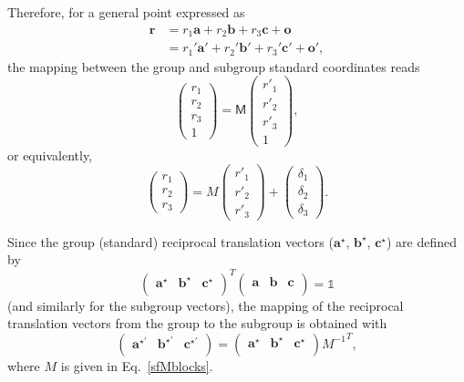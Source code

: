 \documentclass[12pt, a4paper]{article}
\begin{document}
Therefore, for a general point expressed as
\begin{align}
  \bm{r} &= r_1\bm{a}+r_2\bm{b}+r_3\bm{c}+\bm{o}\\
         &= r_1'\bm{a}'+r_2'\bm{b}'+r_3'\bm{c}'+\bm{o}',
\end{align} 
the mapping between the group and subgroup standard coordinates reads
\begin{equation}
  \begin{pmatrix}
    r_1\\
    r_2\\
    r_3\\
    1
  \end{pmatrix}
 =
  \mathsf{M}
  \begin{pmatrix}
    r'_1\\
    r'_2\\
    r'_3\\
    1
  \end{pmatrix},
\end{equation} 
or equivalently,
\begin{equation}
  \begin{pmatrix}
    r_1\\
    r_2\\
    r_3
  \end{pmatrix}
  =
  M
  \begin{pmatrix}
    r'_1\\
    r'_2\\
    r'_3
  \end{pmatrix}
  +
  \begin{pmatrix}
    \delta_1\\
    \delta_2\\
    \delta_3
  \end{pmatrix}.
\end{equation} 

Since the group (standard) reciprocal translation vectors ($\bm{a}^\star$, $\bm{b}^\star$, $\bm{c}^\star$) are defined by
\begin{equation}
  {\begin{pmatrix}
    \bm{a}^\star& \bm{b}^\star & \bm{c}^\star\\
  \end{pmatrix}}^{T}
  \begin{pmatrix}
    \bm{a}& \bm{b} & \bm{c}\\
  \end{pmatrix}
  =
  \mathds{1}
\end{equation} 
(and similarly for the subgroup vectors), 
the mapping of the reciprocal translation vectors from the group to the subgroup is obtained with
\begin{equation}
  \begin{pmatrix}
    \bm{a}^{\star\prime}& \bm{b}^{\star\prime}& \bm{c}^{\star\prime}\\
  \end{pmatrix}
  =
  \begin{pmatrix}
    \bm{a}^{\star}& \bm{b}^{\star}& \bm{c}^{\star}\\
  \end{pmatrix}
  {M^{-1}}^{T},
\end{equation} 
where $M$ is given in Eq.~\ref{sfMblocks}.
\end{document}
